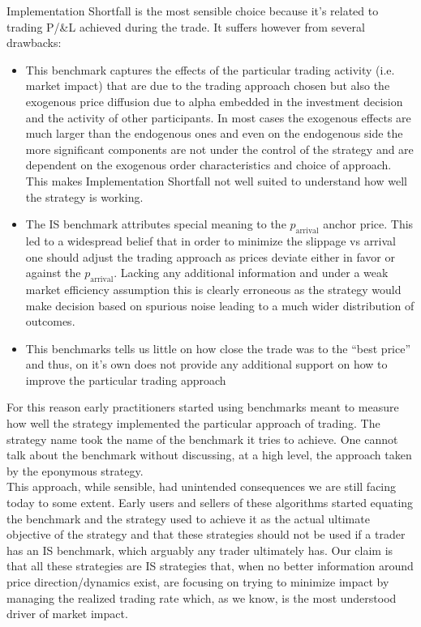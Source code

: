 Implementation Shortfall is the most sensible choice because it's related to trading P/&L achieved during the trade.  It suffers however from several drawbacks:
\begin{itemize}
\item This benchmark captures the effects of the particular trading activity (i.e. market impact) that are due to the trading approach chosen but also the exogenous price diffusion due to alpha embedded in the investment decision and the activity of other participants. In most cases the exogenous effects are much larger than the endogenous ones and even on the endogenous side the more significant components are not under the control of the strategy and are dependent on the exogenous order characteristics and choice of approach. This makes Implementation Shortfall not well suited to understand how well the strategy is working.
\item The IS benchmark attributes special meaning to the $p_{\text{arrival}}$ anchor price. This led to a widespread belief that in order to minimize the slippage vs arrival one should adjust the trading approach as prices deviate either in favor or against the   $p_{\text{arrival}}$. Lacking any additional information and under a weak market efficiency assumption this is clearly erroneous as the strategy would make decision based on spurious noise leading to a much wider distribution of outcomes.
\item This benchmarks tells us little on how close the trade was to the ``best price'' and thus, on it's own does not provide any additional support on how to improve the particular trading approach
\end{itemize}

For this reason early practitioners started using benchmarks meant to measure how well the strategy implemented the particular approach of trading. The strategy name took the name of the benchmark it tries to achieve. One cannot talk about the benchmark without discussing, at a high level, the approach taken by the  eponymous strategy. \\

This approach, while sensible, had unintended consequences we are still facing today to some extent. Early users and sellers of these algorithms started equating the benchmark and the strategy used to achieve it as the actual ultimate objective of the strategy and that these strategies should not be used if a trader has an IS benchmark, which arguably any trader ultimately has. Our claim is that all these strategies are IS strategies that, when no better information around price direction/dynamics exist, are focusing on trying to minimize impact by managing the realized trading rate which, as we know, is the most understood driver of market impact.

